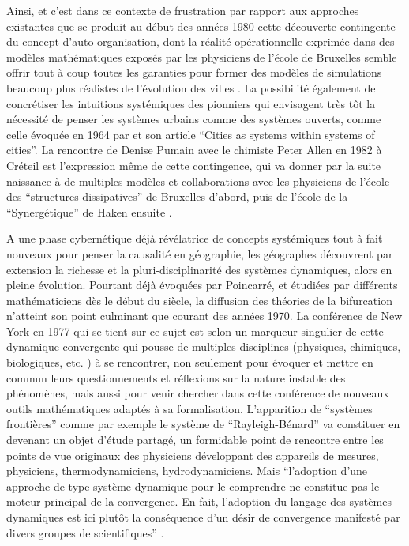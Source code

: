 Ainsi, et c'est dans ce contexte de frustration par rapport aux approches existantes  que se produit au début des années 1980 cette découverte contingente du concept d'auto-organisation, dont la réalité opérationnelle exprimée dans des modèles mathématiques exposés par les physiciens de l'école de Bruxelles semble offrir tout à coup toutes les garanties pour former des modèles de simulations beaucoup plus réalistes de l'évolution des villes  \autocite[350]{Pumain1998a}. La possibilité également de concrétiser les intuitions systémiques des pionniers qui envisagent très tôt la nécessité de penser les systèmes urbains comme des systèmes ouverts, comme celle évoquée en 1964 par \textcite{Berry1964a} et son article \enquote{Cities as systems within systems of cities}. La rencontre de Denise Pumain avec le chimiste Peter Allen en 1982 à Créteil  est l'expression même de cette contingence, qui va donner par la suite naissance à de multiples modèles et collaborations avec les physiciens de l'école des \enquote{structures dissipatives} de Bruxelles d'abord, puis de l'école de la \enquote{Synergétique} de Haken ensuite \autocites[27]{Pumain2003}{Pumain1982b, Mathieu2014,Sanders1984, Sanders1992}.

A une phase cybernétique déjà révélatrice de concepts systémiques tout à fait nouveaux pour penser la causalité en géographie, les géographes découvrent par extension la richesse et la pluri-disciplinarité des systèmes dynamiques, alors en pleine évolution. Pourtant déjà évoquées par Poincarré, et étudiées par différents mathématiciens dès le début du siècle, la diffusion des théories de la bifurcation n'atteint son point culminant que courant des années 1970. La conférence de New York en 1977 qui se tient sur ce sujet est selon \textcite{Dahan1991} un marqueur singulier de cette dynamique convergente qui pousse de multiples disciplines (physiques, chimiques, biologiques, etc. ) à se rencontrer, non seulement pour évoquer et mettre en commun leurs questionnements et réflexions sur la nature instable des phénomènes, mais aussi pour venir chercher dans cette conférence de nouveaux outils mathématiques adaptés à sa formalisation. L'apparition de \enquote{systèmes frontières} comme par exemple le système de \enquote{Rayleigh-Bénard} va constituer en devenant un objet d'étude partagé, un formidable point de rencontre entre les points de vue originaux des physiciens développant des appareils de mesures, physiciens, thermodynamiciens, hydrodynamiciens. Mais \enquote{l’adoption d’une approche de type système dynamique pour le comprendre ne constitue pas le moteur principal de la convergence. En fait, l’adoption du langage des systèmes dynamiques est ici plutôt la conséquence d’un désir de convergence manifesté par divers groupes de scientifiques} \textcite{Dahan1991}.

